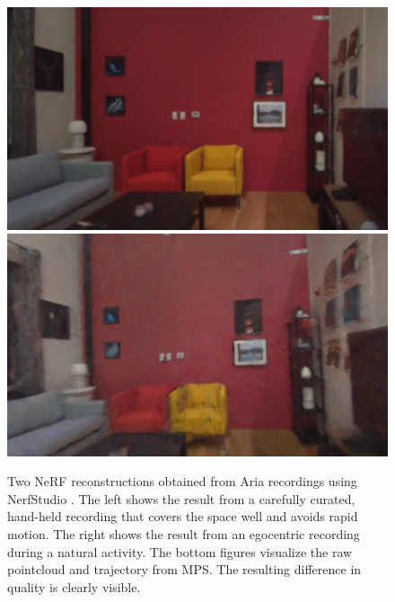 \begin{figure}
    \centering
{%
\setlength{\fboxsep}{0pt}%
\setlength{\fboxrule}{0.5pt}%
\includegraphics[width=0.495\linewidth]{images/applications/nerf_good.jpg}%
\hfill%
\includegraphics[width=0.495\linewidth]{images/applications/nerf_bad.jpg}\\%
%
\hfill%
}%
    \caption{
   Two NeRF reconstructions obtained from Aria recordings using NerfStudio \cite{nerfstudio}. The left shows the result from a carefully curated, hand-held recording that covers the space well and avoids rapid motion. The right shows the result from an egocentric recording during a natural activity. The bottom figures visualize the raw pointcloud and trajectory from MPS. The resulting difference in quality is clearly visible.}
    \label{fig:nerfboxes}
\end{figure}



